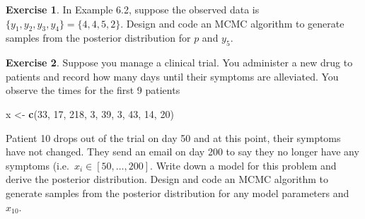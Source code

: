 \documentclass[
]{book}
\newenvironment{Shaded}{\begin{snugshade}}{\end{snugshade}}
\newcommand{\DecValTok}[1]{\textcolor[rgb]{0.00,0.00,0.81}{#1}}
\newcommand{\FunctionTok}[1]{\textcolor[rgb]{0.13,0.29,0.53}{\textbf{#1}}}
\newcommand{\NormalTok}[1]{#1}
\newcommand{\OtherTok}[1]{\textcolor[rgb]{0.56,0.35,0.01}{#1}}
\theoremstyle{definition}
\theoremstyle{definition}
\theoremstyle{definition}
\newtheorem{exercise}{Exercise}[chapter]
\theoremstyle{definition}
\theoremstyle{remark}
\begin{document}
\begin{exercise}
In Example 6.2, suppose the observed data is \(\{y_1, y_2, y_3, y_4\} = \{4, 4, 5 ,2\}\). Design and code an MCMC algorithm to generate samples from the posterior distribution for \(p\) and \(y_5\).
\end{exercise}

\begin{exercise}
Suppose you manage a clinical trial. You administer a new drug to patients and record how many days until their symptoms are alleviated. You observe the times for the first 9 patients

\begin{Shaded}
\begin{Highlighting}[]
\NormalTok{x }\OtherTok{\textless{}{-}} \FunctionTok{c}\NormalTok{(}\DecValTok{33}\NormalTok{,  }\DecValTok{17}\NormalTok{, }\DecValTok{218}\NormalTok{,   }\DecValTok{3}\NormalTok{,  }\DecValTok{39}\NormalTok{,   }\DecValTok{3}\NormalTok{,  }\DecValTok{43}\NormalTok{,  }\DecValTok{14}\NormalTok{,  }\DecValTok{20}\NormalTok{)}
\end{Highlighting}
\end{Shaded}

Patient 10 drops out of the trial on day 50 and at this point, their symptoms have not changed. They send an email on day 200 to say they no longer have any symptoms (i.e.~\(x_i \in [50, \ldots, 200]\). Write down a model for this problem and derive the posterior distribution. Design and code an MCMC algorithm to generate samples from the posterior distribution for any model parameters and \(x_{10}\).
\end{exercise}

  
\end{document}
